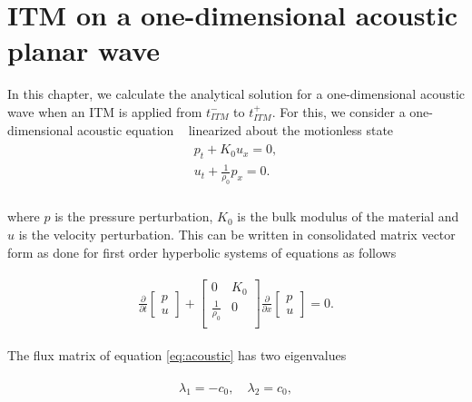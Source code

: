 
\section{\texorpdfstring{\ac{ITM} on a one-dimensional acoustic planar wave}{ITM on a one-dimensional acoustic planar wave}}\label{section:ITMAcoustic}
In this chapter, we calculate the analytical solution for a one-dimensional acoustic wave when an \ac{ITM} is applied from $t_{ITM}^-$ to $t_{ITM}^+$.
For this, we consider a one-dimensional acoustic equation ~\parencite[Sec. 2.8]{leveque_2002} linearized about the motionless state
\begin{align}
    \begin{split}
        p_t + K_0u_x = 0, \\
        u_t + \frac{1}{\rho_0}p_x = 0 .\\
    \end{split}
\end{align}

where $p$ is the pressure perturbation, $K_0$ is the bulk modulus of the material and $u$ is the velocity perturbation. 
This can be written in consolidated matrix vector form as done for first order hyperbolic systems of equations as follows

\begin{align}
    \begin{split}
        \frac{\partial }{\partial t}
    \begin{bmatrix}
        p \\
        u
    \end{bmatrix} + 
    \begin{bmatrix}
        0 & K_0 \\
        \frac{1}{\rho_0} & 0 \\
    \end{bmatrix}
    \frac{\partial }{\partial x}
    \begin{bmatrix}
        p \\
        u
    \end{bmatrix} = 0 .
    \end{split}
    \label{eq:acoustic}
\end{align}

The flux matrix of equation \ref{eq:acoustic} has two eigenvalues

\begin{align}
    \begin{split}
        \lambda_1 = -c_0, \quad \lambda_2 = c_0,
    \end{split}
\end{align}

